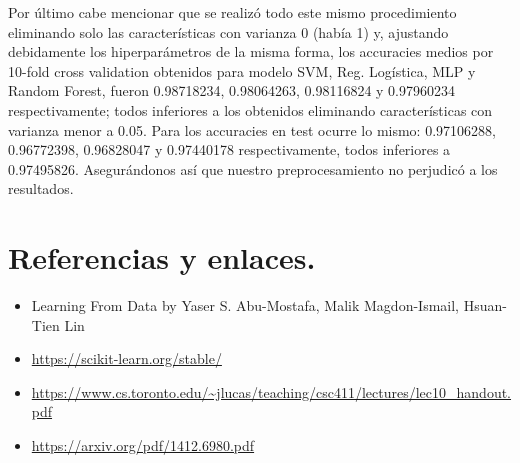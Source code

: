 \documentclass[11pt,a4paper]{article}
\theoremstyle{definition}
\begin{document}
	Por último cabe mencionar que se realizó todo este mismo procedimiento eliminando solo las características con varianza 0 (había 1) y, ajustando debidamente los hiperparámetros de la misma forma, los accuracies medios por 10-fold cross validation obtenidos para modelo SVM, Reg. Logística, MLP y Random Forest, fueron 0.98718234, 0.98064263, 0.98116824 y 0.97960234 respectivamente; todos inferiores a los obtenidos eliminando características con varianza menor a 0.05. Para los accuracies en test ocurre lo mismo: 0.97106288, 0.96772398, 0.96828047 y 0.97440178 respectivamente, todos inferiores a 0.97495826. Asegurándonos así que nuestro preprocesamiento no perjudicó a los resultados.
	\newpage
	\section{Referencias y enlaces.}
	\begin{itemize}
	\item Learning From Data by Yaser S. Abu-Mostafa, Malik Magdon-Ismail, Hsuan-Tien Lin
	\item \url{https://scikit-learn.org/stable/}
	\item \url{https://www.cs.toronto.edu/~jlucas/teaching/csc411/lectures/lec10_handout.pdf}
	\item \url{https://arxiv.org/pdf/1412.6980.pdf}
	\end{itemize}
	
	
\end{document}
